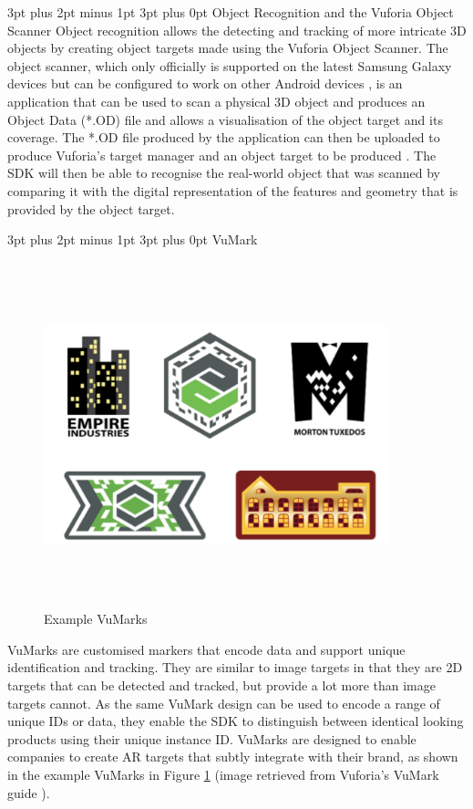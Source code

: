\documentclass[12pt,a4paper]{article}
\makeatletter
\renewcommand\paragraph{\@startsection {paragraph}{1}{0mm} %
	                           {3pt plus 2pt minus 1pt} %
	                           {3pt plus 0pt} %
	                           {\normalfont}}
\makeatother
\begin{document}
\paragraph{Object Recognition and the Vuforia Object Scanner}
Object recognition allows the detecting and tracking of more intricate 3D objects by creating object targets made using the Vuforia Object Scanner. The object scanner, which only officially is supported on the latest Samsung Galaxy devices but can be configured to work on other Android devices \cite{vuforiasupportedversions}, is an application that can be used to scan a physical 3D object and produces an Object Data (*.OD) file and allows a visualisation of the object target and its coverage. The *.OD file produced by the application can then be uploaded to produce Vuforia's target manager and an object target to be produced \cite{vuforiaobjectreco}. The SDK will then be able to recognise the real-world object that was scanned by comparing it with the digital representation of the features and geometry that is provided by the object target.

\paragraph{VuMark}

\begin{figure}[!h]
	\centering
	\includegraphics[width=10cm,height=10cm,keepaspectratio]{images/examplevumarks}
	\caption{Example VuMarks}
	\label{fig_vumark}
\end{figure}

VuMarks are customised markers that encode data and support unique identification and tracking. They are similar to image targets in that they are 2D targets that can be detected and tracked, but provide a lot more than image targets cannot. As the same VuMark design can be used to encode a range of unique IDs or data, they enable the SDK to distinguish between identical looking products using their unique instance ID. VuMarks are designed to enable companies to create AR targets that subtly integrate with their brand, as shown in the example VuMarks in Figure \ref{fig_vumark} (image retrieved from Vuforia's VuMark guide \cite{vuforiavumark}).
\end{document}
